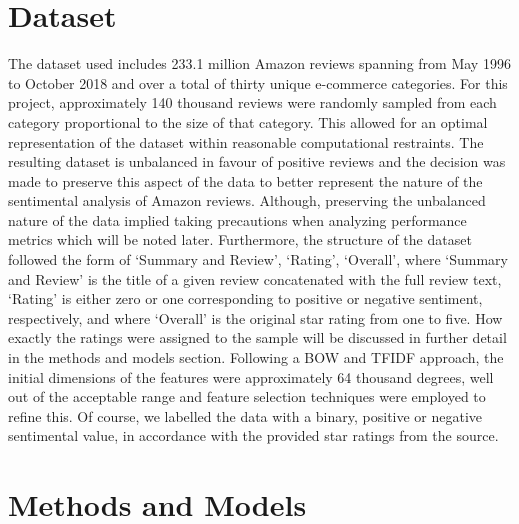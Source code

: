 \documentclass[conference , 11pt]{IEEEtran}
\begin{document}
\section{Dataset}

	The dataset \cite{dataset} used includes 233.1 million Amazon reviews spanning from May 1996 to October 2018 and over a total of thirty unique e-commerce categories. For this project, approximately 140 thousand reviews were randomly sampled from each category proportional to the size of that category. This allowed for an optimal representation of the dataset within reasonable computational restraints. The resulting dataset is unbalanced in favour of positive reviews and the decision was made to preserve this aspect of the data to better represent the nature of the sentimental analysis of Amazon reviews. Although, preserving the unbalanced nature of the data implied taking precautions when analyzing performance metrics which will be noted later. Furthermore, the structure of the dataset followed the form of ‘Summary and Review’, ‘Rating’, ‘Overall’, where ‘Summary and Review’ is the title of a given review concatenated with the full review text, ‘Rating’ is either zero or one corresponding to positive or negative sentiment, respectively, and where ‘Overall’ is the original star rating from one to five. How exactly the ratings were assigned to the sample will be discussed in further detail in the methods and models section.
	Following a BOW and TFIDF approach, the initial dimensions of the features were approximately 64 thousand degrees, well out of the acceptable range and feature selection techniques were employed to refine this. Of course, we labelled the data with a binary, positive or negative sentimental value, in accordance with the provided star ratings from the source.



\section{Methods and Models}
\end{document}
